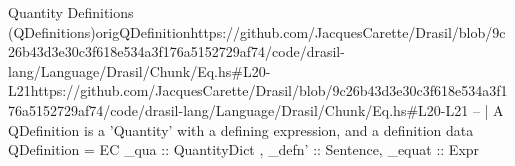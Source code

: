 \begin{haskell}{Quantity Definitions (QDefinitions)}{origQDefinition}{https://github.com/JacquesCarette/Drasil/blob/9c26b43d3e30c3f618e534a3f176a5152729a\newline{}f74/code/drasil-lang/Language/Drasil/Chunk/Eq.hs\#L20-L21}{https://github.com/JacquesCarette/Drasil/blob/9c26b43d3e30c3f618e534a3f176a5152729af74/code/drasil-lang/Language/Drasil/Chunk/Eq.hs\#L20-L21}
-- | A QDefinition is a 'Quantity' with a defining expression, and a definition
data QDefinition = EC { _qua :: QuantityDict , _defn' :: Sentence, _equat :: Expr }
\end{haskell}
